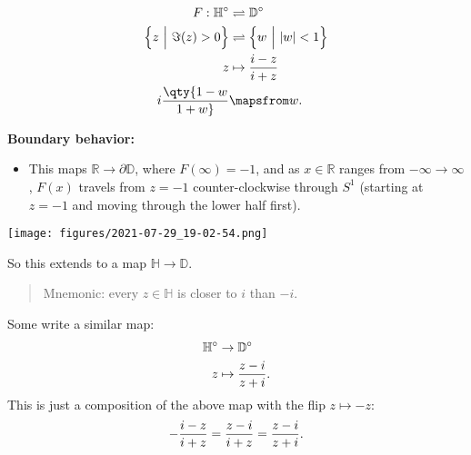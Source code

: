 \begin{proposition}

\begin{align*}
F: {\mathbb{H}}^\circ &\rightleftharpoons{\mathbb{D}}^\circ \\
\left\{{z{~\mathrel{\Big|}~}\Im(z) > 0 }\right\} &\rightleftharpoons\left\{{w{~\mathrel{\Big|}~}{\left\lvert {w} \right\rvert} < 1 }\right\} \\
z &\mapsto {i-z \over i+z} \\
i \qty{1-w \over 1+w} &\mapsfrom w
.\end{align*}

\textbf{Boundary behavior:}

\begin{itemize}
\tightlist
\item
  This maps \({\mathbb{R}}\to {{\partial}}{\mathbb{D}}\), where
  \(F(\infty) = -1\), and as \(x\in {\mathbb{R}}\) ranges from
  \(-\infty\to\infty\), \(F(x)\) travels from \(z=-1\) counter-clockwise
  through \(S^1\) (starting at \(z=-1\) and moving through the lower
  half first).
\end{itemize}

\texttt{[image: figures/2021-07-29\_19-02-54.png]}

So this extends to a map \({\mathbb{H}}\to {\mathbb{D}}\).

\begin{quote}
Mnemonic: every \(z\in {\mathbb{H}}\) is closer to \(i\) than \(-i\).
\end{quote}

\end{proposition}

\begin{remark}

Some write a similar map:
\begin{align*}
{\mathbb{H}}^\circ &\to {\mathbb{D}}^\circ \\
z &\mapsto {z-i \over z+i}
.\end{align*}
This is just a composition of the above map with the flip
\(z\mapsto -z\):
\begin{align*}
- {i-z \over i + z} = {z-i \over i+z} = {z-i \over z+i}
.\end{align*}

\end{remark}

